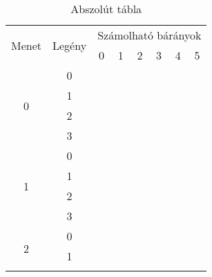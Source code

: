 \documentclass{article}
\newcommand{\blk}{\cellcolor{darkgray}}
\newcommand{\red}{\cellcolor{red!33}}
\newcommand{\grn}{\cellcolor{green!33}}
\newcommand{\nothing}{\text{\raisebox{0.4em}{\rotatebox{180}{$\curvearrowleft$}}}}%
\newcommand{\just}[1]{\boxed{#1}}%
\newcommand{\incl}{\mathbf{incl}}
\newcommand{\excl}{\mathbf{excl}}
\begin{document}
	\begin{table}[H]
		\caption*{Abszolút tábla}
		\centering
		\begin{tabular}{c|c|c|c|c|c|c|c|}
			\multirow{2}{*}{Menet} &  \multirow{2}{*}{Legény}  &    \multicolumn{6}{c|}{Számolható bárányok}                                                          \\
				               &                           &    0              & 1              & 2              & 3              & 4              & 5              \\\hline\hline
			\multirow{4}{*}{0}     &  0                        &    \nothing       & \nothing       & \nothing       & \nothing       & \nothing       & \grn\just\incl \\\cline{2-8}
				               &  1                        &    \nothing       & \nothing       & \nothing       & \nothing       & \nothing       & \grn\just\incl \\\cline{2-8}
				               &  2                        &    \red\just\excl & \nothing       & \nothing       & \nothing       & \nothing       & \grn\just\incl \\\cline{2-8}
				               &  3                        &    \red\just\excl & \nothing       & \nothing       & \nothing       & \nothing       & \grn\just\incl \\\hline\hline
			\multirow{4}{*}{1}     &  0                        &    \red\just\excl & \nothing       & \nothing       & \nothing       & \grn\just\incl & \blk           \\\cline{2-8}
				               &  1                        &    \red\just\excl & \nothing       & \nothing       & \nothing       & \grn\just\incl & \blk           \\\cline{2-8}
				               &  2                        &    \blk           & \red\just\excl & \nothing       & \nothing       & \grn\just\incl & \blk           \\\cline{2-8}
				               &  3                        &    \blk           & \red\just\excl & \nothing       & \nothing       & \grn\just\incl & \blk           \\\hline\hline
			\multirow{4}{*}{2}     &  0                        &    \blk           & \red\just\excl & \nothing       & \grn\just\incl & \blk           & \blk           \\\cline{2-8}
				               &  1                        &    \blk           & \red\just\excl & \nothing       & \grn\just\incl & \blk           & \blk           \\\cline{2-8}

\end{tabular}
\end{table}
\end{document}
